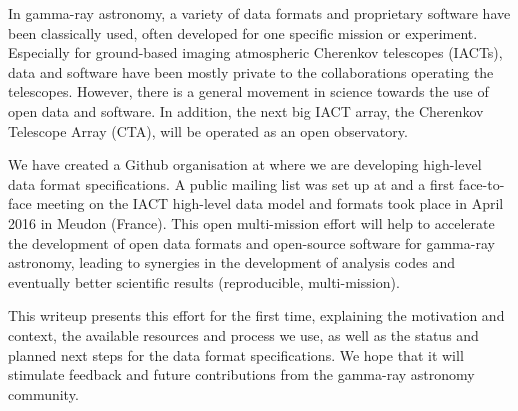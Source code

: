 In gamma-ray astronomy, a variety of data formats and proprietary software have been classically used, often developed for one specific mission or experiment. Especially for ground-based imaging atmospheric Cherenkov telescopes (IACTs), data and software have been mostly private to the collaborations operating the telescopes. However, there is a general movement in science towards the use of open data and software. In addition, the next big IACT array, the Cherenkov Telescope Array (CTA), will be operated as an open observatory.

We have created a Github organisation at \ogragithub where we are developing high-level data format specifications. A public mailing list was set up at \ogralist and a first face-to-face meeting on the IACT high-level data model and formats took place in April 2016 in Meudon (France). This open multi-mission effort will help to accelerate the development of open data formats and open-source software for gamma-ray astronomy, leading to synergies in the development of analysis codes and eventually better scientific results (reproducible, multi-mission).

This writeup presents this effort for the first time, explaining the motivation and context, the available resources and process we use, as well as the status and planned next steps for the data format specifications. We hope that it will stimulate feedback and future contributions from the gamma-ray astronomy community.
